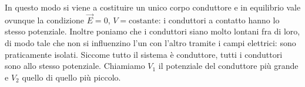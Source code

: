In questo modo si viene a costituire un unico corpo conduttore e in equilibrio vale ovunque la condizione $\vec{E}=0 $, $V=\text{costante}$: i conduttori a contatto hanno lo stesso potenziale. Inoltre poniamo che i conduttori siano molto lontani fra di loro, di modo tale che non si influenzino l'un con l'altro tramite i campi elettrici: sono praticamente isolati. Siccome tutto il sistema è conduttore, tutti i conduttori sono allo stesso potenziale. Chiamiamo $V_1$ il potenziale del conduttore più grande e $V_2$ quello di quello più piccolo.

\begin{figure}[htpb]
	\centering

	 
	\tikzset{
	pattern size/.store in=\mcSize, 
	pattern size = 5pt,
	pattern thickness/.store in=\mcThickness, 
	pattern thickness = 0.3pt,
	pattern radius/.store in=\mcRadius, 
	pattern radius = 1pt}
	\makeatletter
	\makeatother

	 
	\tikzset{
	pattern size/.store in=\mcSize, 
	pattern size = 5pt,
	pattern thickness/.store in=\mcThickness, 
	pattern thickness = 0.3pt,
	pattern radius/.store in=\mcRadius, 
	pattern radius = 1pt}
	\makeatletter
	\makeatother

	\begin{tikzpicture}[x=0.75pt,y=0.75pt,yscale=-0.8,xscale=0.8]


\end{tikzpicture}
\end{figure}
